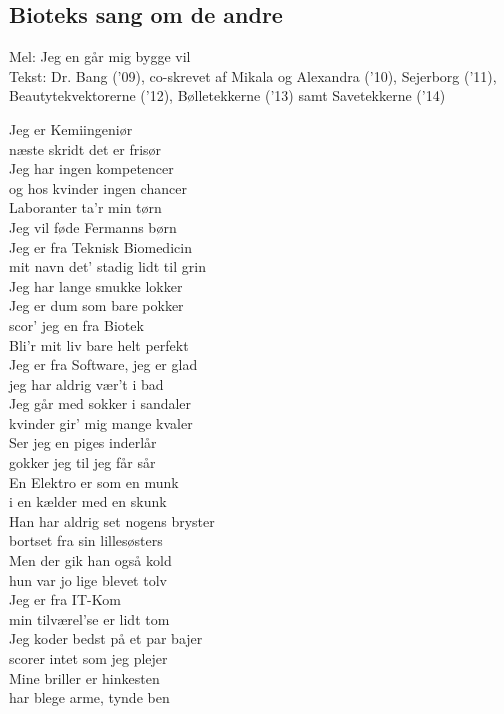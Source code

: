 \subsection*{Bioteks sang om de andre}

Mel: Jeg en går mig bygge vil\\

Tekst: Dr. Bang (’09), co-skrevet af Mikala og Alexandra (’10), Sejerborg (’11), Beautytekvektorerne (’12), Bølletekkerne (’13) samt Savetekkerne (’14)

Jeg er Kemiingeniør\\
næste skridt det er frisør\\
Jeg har ingen kompetencer\\
og hos kvinder ingen chancer\\
Laboranter ta’r min tørn\\
Jeg vil føde Fermanns børn\\

Jeg er fra Teknisk Biomedicin\\
mit navn det’ stadig lidt til grin\\
Jeg har lange smukke lokker\\
Jeg er dum som bare pokker\\
scor’ jeg en fra Biotek\\
Bli’r mit liv bare helt perfekt\\

Jeg er fra Software, jeg er glad\\
jeg har aldrig vær’t i bad\\
Jeg går med sokker i sandaler\\
kvinder gir’ mig mange kvaler\\
Ser jeg en piges inderlår\\
gokker jeg til jeg får sår\\

En Elektro er som en munk\\
i en kælder med en skunk\\
Han har aldrig set nogens bryster\\
bortset fra sin lillesøsters\\
Men der gik han også kold\\
hun var jo lige blevet tolv\\

Jeg er fra IT-Kom\\
min tilværel’se er lidt tom\\
Jeg koder bedst på et par bajer\\
scorer intet som jeg plejer\\
Mine briller er hinkesten\\
har blege arme, tynde ben\\

